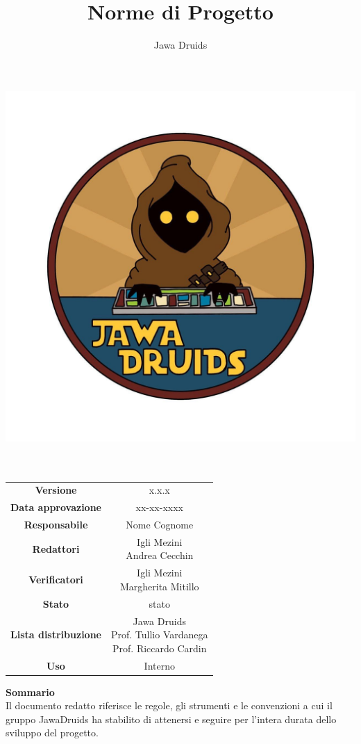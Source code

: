 



	\makeatletter
	\begin{titlepage}
		\begin{center}
			\vspace*{-4,0cm}
			\author{Jawa Druids}
			\title{Norme di Progetto}
			\date{}
			\includegraphics[width=0.7\linewidth]{../immagini/DRUIDSLOGO.jpg}\\[4ex]
			{\huge \bfseries  \@title }\\[2ex] 
			{\LARGE  \@author}\\[50ex]
			\vspace*{-8,0cm}
			\begin{table}[H]
				\centering
				\begin{tabular}{c|c}
					\textbf{Versione} & x.x.x \\
					\textbf{Data approvazione} & xx-xx-xxxx\\
					\textbf{Responsabile} & Nome Cognome\\
					\textbf{Redattori} & \makecell{Igli Mezini \\ Andrea Cecchin} \\ 
					
					\textbf{Verificatori} & \makecell{Igli Mezini \\ Margherita Mitillo} \\
					\textbf{Stato} & stato\\
					\textbf{Lista distribuzione} & \makecell{Jawa Druids \\ Prof. Tullio Vardanega \\ Prof. Riccardo Cardin}\\
					\textbf{Uso} & Interno			
				\end{tabular}
			\end{table}
			\fontsize{17}{12}\textbf{Sommario} \\
			Il documento redatto riferisce le regole, gli strumenti e le convenzioni a cui il gruppo JawaDruids ha stabilito di attenersi e seguire per l'intera durata dello sviluppo del progetto.
		\end{center}
	\end{titlepage}
	\makeatother
	
	
	
	\tableofcontents{}
	
	
	
	
	
	
